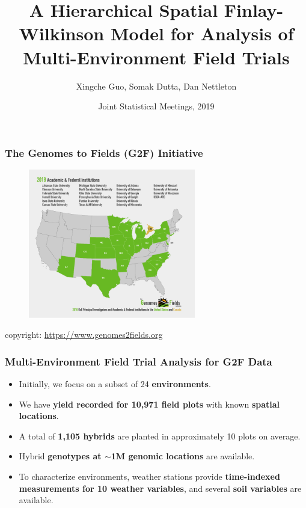 \documentclass{beamer}
\title[Hierarchical Spatial FW Model for MET]{A Hierarchical Spatial Finlay-Wilkinson Model for Analysis of Multi-Environment Field Trials}
\author[Guo, X., Dutta, S., Nettleton, D.]{Xingche Guo, Somak Dutta, Dan Nettleton}
\institute[ISU]{Dept. of Statistics, Iowa State University}
\date[JSM, 2019]{Joint Statistical Meetings, 2019}
\begin{document}
\renewcommand{\inserttotalframenumber}{19}
\begin{frame}
\titlepage
\end{frame}




\begin{frame}
	\frametitle{The Genomes to Fields (G2F) Initiative}
	\begin{figure}[H]
		\centering
		\includegraphics[width = 0.65\textwidth]{g2f_demo.png}
	\end{figure}	
	copyright:	\url{https://www.genomes2fields.org}
\end{frame}


\begin{frame}
	\frametitle{Multi-Environment Field Trial Analysis for G2F Data}
	\begin{itemize}
	\item Initially, we focus on a subset of 24 \textbf{environments}.
	\item We have \textbf{yield recorded for 10,971 field plots} with known \textbf{spatial locations}.
	\item A total of \textbf{1,105 hybrids} are planted in approximately 10 plots on average.
	\item Hybrid \textbf{genotypes at $\sim$1M genomic locations} are available.
	\item To characterize environments, weather stations provide \textbf{time-indexed measurements for 10 weather variables}, and several \textbf{soil variables} are available.
	\end{itemize}	
\end{frame}
\end{document}
